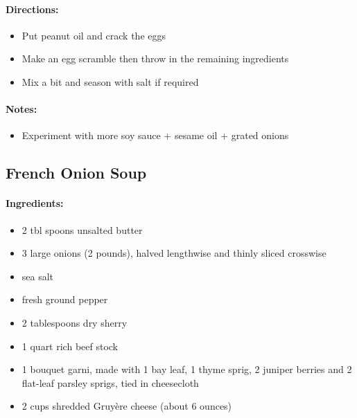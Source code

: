 \documentclass{article}
\begin{document}
\paragraph{Directions:}
\begin{itemize}
	\item Put peanut oil and crack the eggs
	\item Make an egg scramble then throw in the remaining ingredients
	\item Mix a bit and season with salt if required
	
\end{itemize}

\paragraph{Notes:}
\begin{itemize}
	\item Experiment with more soy sauce + sesame oil + grated onions
\end{itemize}

\subsection{French Onion Soup}

\paragraph{Ingredients:}

\begin{itemize}
	\item 2 tbl spoons unsalted butter
	\item 3 large onions (2 pounds), halved lengthwise and thinly sliced crosswise
	\item sea salt
	\item fresh ground pepper
	\item 2 tablespoons dry sherry
	\item 1 quart rich beef stock
	\item 1 bouquet garni, made with 1 bay leaf, 1 thyme sprig, 2 juniper berries and 2 flat-leaf parsley sprigs, tied in cheesecloth
	\item 2 cups shredded Gruyère cheese (about 6 ounces)
\end{itemize}
\end{document}

